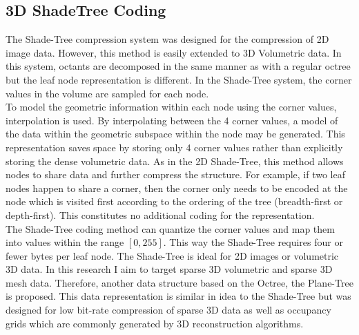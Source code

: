 \subsection{3D ShadeTree Coding}

\label{sec:dr:coding}

The Shade-Tree compression system \cite{Gonzalez07ShadeTree} was designed for the compression of 2D image data. However, this method is easily extended to 3D Volumetric data. In this system, octants are decomposed in the same manner as with a regular octree but the leaf node representation is different. In the Shade-Tree system, the corner values in the volume are sampled for each node.  \\


To model the geometric information within each node using the corner values, interpolation is used. By interpolating between the 4 corner values, a model of the data within the geometric subspace within the node may be generated. This representation saves space by storing only 4 corner values rather than explicitly storing the dense volumetric data. As in the 2D Shade-Tree, this method allows nodes to share data and further compress the structure. For example, if two leaf nodes happen to share a corner, then the corner only needs to be encoded at the node which is visited first according to the ordering of the tree (breadth-first or depth-first). This constitutes no additional coding for the representation. \\

The Shade-Tree coding method can quantize the corner values and map them into values within the range $[0,255]$. This way the Shade-Tree requires four or fewer bytes per leaf node. The Shade-Tree is ideal for 2D images or volumetric 3D data. In this research I aim to target sparse 3D volumetric and sparse 3D mesh data. Therefore, another data structure based on the Octree, the Plane-Tree is proposed. This data representation is similar in idea to the Shade-Tree but was designed for low bit-rate compression of sparse 3D data as well as occupancy grids which are commonly generated by 3D reconstruction algorithms. \\



